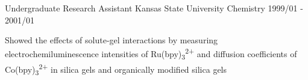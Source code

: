 \begin{cventries}
  \cventry
    {Undergraduate Research Assistant} %
    {Kansas State University} %
    {Chemistry} %
    {1999/01 - 2001/01} %
    {
      \begin{cvitems} %
        \item {Showed the effects of solute-gel interactions by measuring electrochemiluminescence intensities of Ru(bpy)\textsubscript{3}\textsuperscript{2+} and diffusion coefficients of Co(bpy)\textsubscript{3}\textsuperscript{2+} in silica gels and organically modified silica gels}
      \end{cvitems}
    }
    
\end{cventries}
